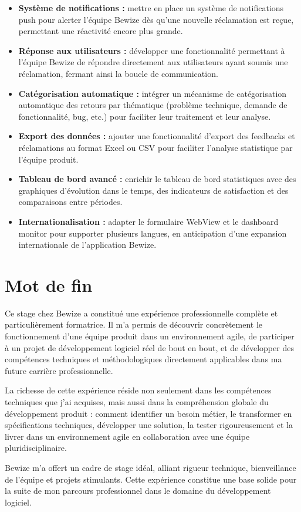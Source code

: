 \begin{itemize}
    \item \textbf{Système de notifications :} mettre en place un 
    système de notifications push pour alerter l'équipe Bewize 
    dès qu'une nouvelle réclamation est reçue, permettant une 
    réactivité encore plus grande.
    
    \item \textbf{Réponse aux utilisateurs :} développer une 
    fonctionnalité permettant à l'équipe Bewize de répondre 
    directement aux utilisateurs ayant soumis une réclamation, 
    fermant ainsi la boucle de communication.
    
    \item \textbf{Catégorisation automatique :} intégrer un 
    mécanisme de catégorisation automatique des retours par 
    thématique (problème technique, demande de fonctionnalité, 
    bug, etc.) pour faciliter leur traitement et leur analyse.
    
    \item \textbf{Export des données :} ajouter une fonctionnalité 
    d'export des feedbacks et réclamations au format Excel ou CSV 
    pour faciliter l'analyse statistique par l'équipe produit.
    
    \item \textbf{Tableau de bord avancé :} enrichir le tableau 
    de bord statistiques avec des graphiques d'évolution dans le 
    temps, des indicateurs de satisfaction et des comparaisons 
    entre périodes.
    
    \item \textbf{Internationalisation :} adapter le formulaire 
    WebView et le dashboard monitor pour supporter plusieurs langues, 
    en anticipation d'une expansion internationale de l'application 
    Bewize.
\end{itemize}

\section{Mot de fin}
Ce stage chez Bewize a constitué une expérience professionnelle 
complète et particulièrement formatrice. Il m'a permis de découvrir 
concrètement le fonctionnement d'une équipe produit dans un 
environnement agile, de participer à un projet de développement 
logiciel réel de bout en bout, et de développer des compétences 
techniques et méthodologiques directement applicables dans ma 
future carrière professionnelle.

La richesse de cette expérience réside non seulement dans les 
compétences techniques que j'ai acquises, mais aussi dans la 
compréhension globale du développement produit : comment identifier 
un besoin métier, le transformer en spécifications techniques, 
développer une solution, la tester rigoureusement et la livrer 
dans un environnement agile en collaboration avec une équipe 
pluridisciplinaire.

Bewize m'a offert un cadre de stage idéal, alliant rigueur technique, 
bienveillance de l'équipe et projets stimulants. Cette expérience 
constitue une base solide pour la suite de mon parcours professionnel 
dans le domaine du développement logiciel.